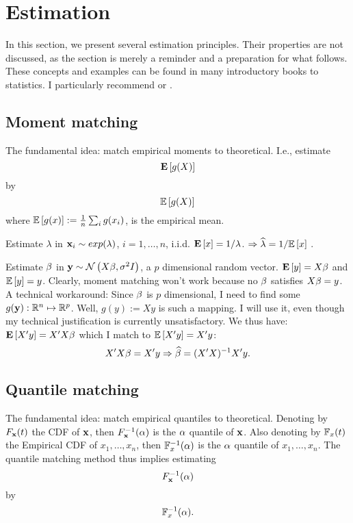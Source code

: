 
\chapter{Estimation}
\label{sec:estimation} 
In this section, we present several estimation principles. 
Their properties are not discussed, as the section is merely a reminder and a preparation for what follows.
These concepts and examples can be found in many introductory books to statistics. I particularly recommend \cite{wasserman_all_2004} or \cite{abramovich_statistical_2013}.

\section{Moment matching}
\label{sec:moment_matching}

The fundamental idea: match empirical moments to theoretical. I.e., estimate
$$ \mathbf{E}\left[ g(X) \right]   $$
by 
$$ \mathbb{E}\left[g(X)\right]   $$
where $\mathbb{E}\left[g(x)\right]:=\frac{1}{n}  \sum_i g(x_i)$, is the empirical mean.

\begin{example}

Estimate $\lambda$ in $\mathbf{x}_i \sim exp(\lambda)$, $i=1,\dots,n$, i.i.d.
$\mathbf{E}\left[ x \right]=1/\lambda$.
$\Rightarrow \widehat{\lambda}=1/\mathbb{E}\left[x\right]$ .

\end{example}


\begin{example}

Estimate $\beta$ in $\mathbf{y} \sim \mathcal{N}\left(X\beta,\sigma^2 I\right)$, a $p$ dimensional random vector.
$\mathbf{E}\left[ y \right]=X\beta$ and $\mathbb{E}\left[y\right]=y$.
Clearly, moment matching won't work because no $\beta$ satisfies $X\beta=y$.
A technical workaround:
Since $\beta$ is $p$ dimensional, I need to find some $g(\mathbf{y}): \mathbb{R}^n \mapsto \mathbb{R}^p$.
Well, $g(y):=Xy$ is such a mapping. I will use it, even though my technical justification is currently unsatisfactory. We thus have:
$\mathbf{E}\left[ X'y \right]=X'X\beta$ which I match to $\mathbb{E}\left[X'y\right]=X'y$:
$$
  X'X \beta = X' y \Rightarrow \widehat{\beta}=(X'X)^{-1} X'y.
$$

\end{example}


\section{Quantile matching}
\label{sec:quantiles}

The fundamental idea: match empirical quantiles to theoretical. 
Denoting by $F_{\mathbf{x}} (t)$ the CDF of $\mathbf{x}$, then $F_{\mathbf{x}}^{-1} (\alpha)$ is the $\alpha$ quantile of $\mathbf{x}$.
Also denoting by $\mathbb{F}_{x}(t)$ the Empirical CDF of $x_1,\dots, x_n$, then $\mathbb{F}^{-1}_{x}(\alpha)$ is the $\alpha$ quantile of $x_1,\dots, x_n$.
The quantile matching method thus implies estimating
$$ F_{\mathbf{x}}^{-1} (\alpha) $$
by 
$$ \mathbb{F}^{-1}_{x}(\alpha)  . $$

